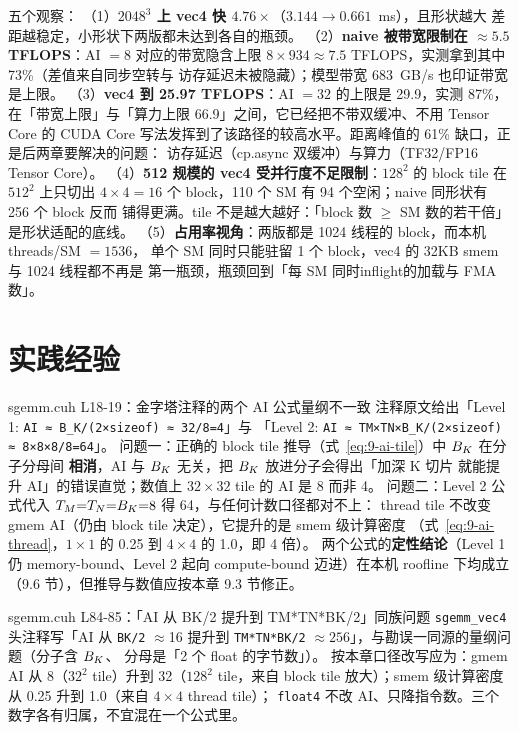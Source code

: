 五个观察：
（1）\textbf{$2048^3$ 上 vec4 快 $4.76\times$}（$3.144 \to 0.661$~ms），且形状越大
差距越稳定，小形状下两版都未达到各自的瓶颈。
（2）\textbf{naive 被带宽限制在 $\approx 5.5$ TFLOPS}：AI $=8$ 对应的带宽隐含上限
$8 \times 934 \approx 7.5$ TFLOPS，实测拿到其中 73\%（差值来自同步空转与
访存延迟未被隐藏）；模型带宽 683~GB/s 也印证带宽是上限。
（3）\textbf{vec4 到 25.97 TFLOPS}：AI $=32$ 的上限是 29.9，实测 87\%，
在「带宽上限」与「算力上限 66.9」之间，它已经把不带双缓冲、不用 Tensor Core 的
CUDA Core 写法发挥到了该路径的较高水平。距离峰值的 61\% 缺口，正是后两章要解决的问题：
访存延迟（cp.async 双缓冲）与算力（TF32/FP16 Tensor Core）。
（4）\textbf{512 规模的 vec4 受并行度不足限制}：$128^2$ 的 block tile 在 $512^2$ 上只切出
$4 \times 4 = 16$ 个 block，110 个 SM 有 94 个空闲；naive 同形状有 256 个 block 反而
铺得更满。tile 不是越大越好：「block 数 $\ge$ SM 数的若干倍」是形状适配的底线。
（5）\textbf{占用率视角}：两版都是 1024 线程的 block，而本机 threads/SM $=1536$，
单个 SM 同时只能驻留 1 个 block，vec4 的 32KB smem 与 1024 线程都不再是
第一瓶颈，瓶颈回到「每 SM 同时inflight的加载与 FMA 数」。

\section{实践经验}

\begin{kaogu}[F3]{sgemm.cuh L18-19：金字塔注释的两个 AI 公式量纲不一致}
  注释原文给出「Level 1: \texttt{AI ≈ B\_\allowbreak{}K/\allowbreak{}(2×sizeof) ≈ 32/\allowbreak{}8=\allowbreak{}4}」与
  「Level 2: \texttt{AI ≈ TM×TN×B\_\allowbreak{}K/\allowbreak{}(2×sizeof) ≈ 8×8×8/\allowbreak{}8=\allowbreak{}64}」。
  问题一：正确的 block tile 推导（式~\ref{eq:9-ai-tile}）中 $B\sb{K}$ 在分子分母间
  \textbf{相消}，AI 与 $B\sb{K}$ 无关，把 $B\sb{K}$ 放进分子会得出「加深 K 切片
  就能提升 AI」的错误直觉；数值上 $32 \times 32$ tile 的 AI 是 8 而非 4。
  问题二：Level 2 公式代入 $T\sb{M}{=}T\sb{N}{=}B\sb{K}{=}8$ 得 64，与任何计数口径都对不上：
  thread tile 不改变 gmem AI（仍由 block tile 决定），它提升的是 smem 级计算密度
  （式~\ref{eq:9-ai-thread}，$1 \times 1$ 的 0.25 到 $4 \times 4$ 的 1.0，即 4 倍）。
  两个公式的\textbf{定性结论}（Level 1 仍 memory-bound、Level 2 起向 compute-bound
  迈进）在本机 roofline 下均成立（9.6 节），但推导与数值应按本章 9.3 节修正。
\end{kaogu}

\begin{kaogu}[F3]{sgemm.cuh L84-85：「AI 从 BK/2 提升到 TM*TN*BK/2」同族问题}
  \texttt{sgemm\_vec4} 头注释写「AI 从 \texttt{BK/2} $\approx$16 提升到
  \texttt{TM*TN*BK/2} $\approx 256$」，与勘误一同源的量纲问题（分子含 $B\sb{K}$、
  分母是「2 个 float 的字节数」）。
  按本章口径改写应为：gmem AI 从 8（$32^2$ tile）升到 32（$128^2$ tile，来自
  block tile 放大）；smem 级计算密度从 0.25 升到 1.0（来自 $4 \times 4$ thread tile）；
  \texttt{float4} 不改 AI、只降指令数。三个数字各有归属，不宜混在一个公式里。
\end{kaogu}

